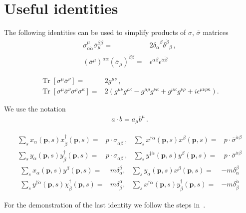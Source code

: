 \section{Useful identities}
The following identities can be used to simplify products of $\sigma$, $\overline{\sigma}$ matrices %
\begin{align}
  \label{eq:sos}
  \sigma^{\mu}_{\alpha\dot{\alpha}}\overline{\sigma}_{\mu}^{\dot{\beta}\beta}=&2{\delta_{\alpha}}^{\beta}{\delta^{\dot{\beta}}}_{\beta}\,,\nonumber\\
  \left( \overline{\sigma}^{\mu} \right)^{\dot{\alpha}\alpha} \left( \overline{\sigma}_{\mu} \right)^{\dot{\beta}\beta}=&\epsilon^{\alpha\beta}\epsilon^{\dot{\alpha}\dot{\beta}}
\end{align}


\begin{align} %
  \label{eq:trss}
  \operatorname{Tr}\left[ \sigma^{\mu}\overline{\sigma}^{\nu} \right]=&2 g^{\mu\nu}\,, \\
  \operatorname{Tr}\left[ \sigma^{\mu}\overline{\sigma}^{\nu}\sigma^{\rho}\sigma^{\kappa} \right]=&
   2 \left(g^{\mu\nu}g^{\rho\kappa}-g^{\mu\rho}g^{\nu\kappa}+g^{\mu\kappa}g^{\nu\rho} +i\epsilon^{\mu\nu\rho\kappa} \right).
\end{align}


We use the notation
\begin{align}
  a\cdot b=a_{\mu}b^{\mu}\,.
\end{align}

\begin{frame}
\begin{align}
\label{eq:xxd}
  \sum_s x_{\alpha}(\mathbf{p},s)x^{\dagger}_{\dot{\beta}}(\mathbf{p},s)=&p\cdot \sigma_{\alpha\dot{\beta}}\,, &    \sum_s x^{\dagger \dot{\alpha}}(\mathbf{p},s) x^{\beta}(\mathbf{p},s)=&p\cdot \overline{\sigma}^{\dot{\alpha}\beta}\nonumber\\
  \sum_s y_{\alpha}(\mathbf{p},s)y^{\dagger}_{\dot{\beta}}(\mathbf{p},s)=&p\cdot \sigma_{\alpha\dot{\beta}}\,, &   \sum_s y^{\dagger \dot{\alpha}}(\mathbf{p},s) y^{\beta}(\mathbf{p},s)=&p\cdot \overline{\sigma}^{\dot{\alpha}\beta} 
\end{align}
\begin{align}
\sum_{s} x_{\alpha}({\boldsymbol{p}}, s) y^{\beta}({\boldsymbol{p}}, s)=&m \delta_{\alpha}^{\beta}, & \sum_{s} y_{\alpha}({\boldsymbol{p}}, s) x^{\beta}({\boldsymbol{p}}, s)=&-m \delta_{\alpha}^{\beta} \nonumber\\
\sum_{s} y^{\dagger \dot{\alpha}}({\boldsymbol{p}}, s) \chi_{\dot{\beta}}^{\dagger}({\boldsymbol{p}}, s)=&m \delta^{\dot{\alpha}}_{\dot{\beta}}, & \sum_{s} x^{\dagger \dot{\alpha}}({\boldsymbol{p}}, s) y_{\dot{\beta}}^{\dagger}({\boldsymbol{p}}, s)=&-m \delta^{\dot{\alpha}}_{\dot{\beta}}
\end{align}



For the demonstration of the last identity we follow the steps in~\cite{Dreiner:2008tw}. 

\end{frame}


